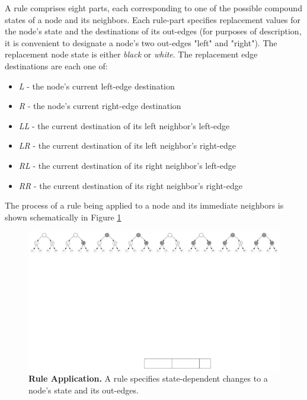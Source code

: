 \documentclass{tufte-handout}
\begin{document}
A rule comprises eight parts, each corresponding to one of the possible compound states
of a node and its neighbors. Each rule-part specifies replacement values for
the node's state and the destinations of its out-edges
(for purposes of description, it is convenient to designate a node's two out-edges "left" and "right").
The replacement node state is either \textit{black} or \textit{white}.
The replacement edge destinations are each one of:

\vspace{1mm}
\begin{itemize}
\setlength{\itemindent}{2em}
    \item \textit{L} - the node's current left-edge destination
    \item \textit{R} - the node's current right-edge destination
    \item \textit{LL} - the current destination of its left neighbor's left-edge
    \item \textit{LR} - the current destination of its left neighbor's right-edge
    \item \textit{RL} - the current destination of its right neighbor's left-edge
    \item \textit{RR} - the current destination of its right neighbor's right-edge
\end{itemize}
\vspace{2mm}

The process of a rule being applied to a node and its immediate neighbors is shown
schematically in Figure \ref{fig:Ruleapplication}

\begin{figure}
\includegraphics{placeholder.png}
\caption{\textbf{Rule Application.} A rule specifies state-dependent changes to a node's state and its out-edges.}
\label{fig:Ruleapplication}
\end{figure}
\end{document}
